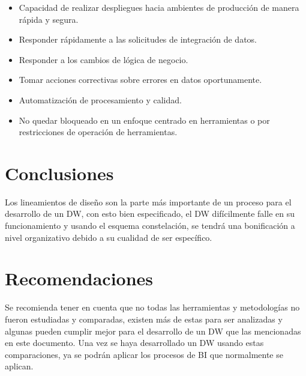 \documentclass[twoside,twocolumn]{article}
\begin{document}
\begin{itemize}
    \item Capacidad de realizar despliegues hacia ambientes de producción de manera rápida y segura. 
    \item Responder rápidamente a las solicitudes de integración de datos.
    \item Responder a los cambios de lógica de negocio.
    \item Tomar acciones correctivas sobre errores en datos oportunamente.
    \item Automatización de procesamiento y calidad.
    \item No quedar bloqueado en un enfoque centrado en herramientas o por restricciones de operación de herramientas.  
\end{itemize}


\section{Conclusiones}
Los lineamientos de diseño son la parte más importante de un proceso para el desarrollo de un DW, con esto bien especificado, el DW difícilmente falle en su funcionamiento y usando el esquema constelación, se tendrá una bonificación a nivel organizativo debido a su cualidad de ser específico. 

\section{Recomendaciones}
Se recomienda tener en cuenta que no todas las herramientas y metodologías no fueron estudiadas y comparadas, existen más de estas para ser analizadas y algunas pueden cumplir mejor para el desarrollo de un DW que las mencionadas en este documento.  
Una vez se haya desarrollado un DW usando estas comparaciones, ya se podrán aplicar los procesos de BI que normalmente se aplican. 
 
 
\end{document}
